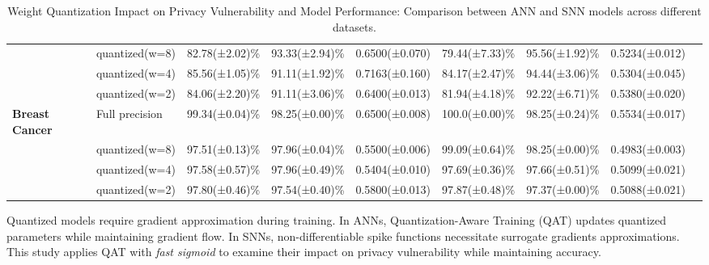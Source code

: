 \begin{table*}[htbp]
{\begin{tabular}{l l c c c c c c c}
 & quantized(w=8) & 82.78(±2.02)\% & 93.33(±2.94)\% & 0.6500(±0.070) & 79.44(±7.33)\% & 95.56(±1.92)\% & 0.5234(±0.012) \\
 & quantized(w=4) & 85.56(±1.05)\% & 91.11(±1.92)\% & 0.7163(±0.160) & 84.17(±2.47)\% & 94.44(±3.06)\% & 0.5304(±0.045) \\
 & quantized(w=2) & 84.06(±2.20)\% & 91.11(±3.06)\% & 0.6400(±0.013) & 81.94(±4.18)\% & 92.22(±6.71)\% & 0.5380(±0.020) \\
\midrule
\textbf{Breast Cancer} & Full precision & 99.34(±0.04)\% & 98.25(±0.00)\% & 0.6500(±0.008) & 100.0(±0.00)\% & 98.25(±0.24)\% & 0.5534(±0.017) \\
 & quantized(w=8) & 97.51(±0.13)\% & 97.96(±0.04)\% & 0.5500(±0.006) & 99.09(±0.64)\% & 
 98.25(±0.00)\% & 0.4983(±0.003) \\
 & quantized(w=4) & 97.58(±0.57)\% & 97.96(±0.49)\% & 0.5404(±0.010) & 97.69(±0.36)\% & 97.66(±0.51)\% & 0.5099(±0.021) \\
 & quantized(w=2) & 97.80(±0.46)\% & 97.54(±0.40)\% & 0.5800(±0.013) & 97.87(±0.48)\% & 
 97.37(±0.00)\% & 0.5088(±0.021) \\
\bottomrule
\end{tabular}%
}
\caption{Weight Quantization Impact on Privacy Vulnerability and Model Performance: Comparison between ANN and SNN models across different datasets.}
\label{table:weight_quan}
\end{table*}

Quantized models require gradient approximation during training. In ANNs, Quantization-Aware Training (QAT) updates quantized parameters while maintaining gradient flow. In SNNs, non-differentiable spike functions necessitate surrogate gradients approximations. This study applies QAT  with \textit{fast sigmoid} to examine their impact on privacy vulnerability while maintaining accuracy.



